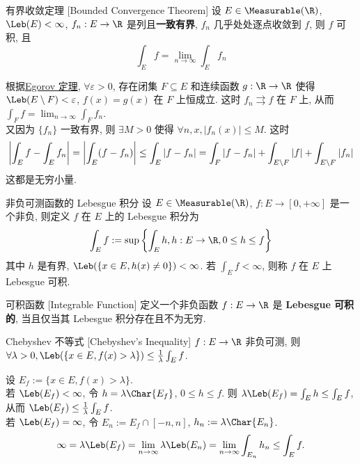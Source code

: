 \begin{thm}
    [bct]
    {有界收敛定理}
    [Bounded Convergence Theorem]
    设 $E\in\Measurable(\R)$, \(\Leb(E)<\infty\), \(f_n:E\to\R\) 是\MeasurableFunc{}列且\textbf{一致有界}, \(f_n\) 几乎处处逐点收敛到 \(f\), 则 \(f\) 可积, 且 
    \[\int_E f = \lim_{n\to\infty} \int_E f_n\]
\end{thm}
\begin{prf}
    根据\hyperref[thm:egorov]{Egorov 定理}, \(\forall\varepsilon>0\), 存在闭集 \(F\subseteq E\) 和连续函数 \(g:\R\to\R\) 使得 \(\Leb(E\setminus F)<\varepsilon\), \(f(x)=g(x)\) 在 \(F\) 上恒成立. 这时 \(f_n\rightrightarrows f\) 在 \(F\) 上, 从而 \(\int_F f = \lim_{n\to\infty} \int_F f_n\).\\
    又因为 \(\{f_n\}\) 一致有界, 则 \(\exists M>0\) 使得 \(\forall n,x, |f_n(x)|\leq M\). 这时
    \[\vqty{\int_E f-\int_Ef_n}=\vqty{\int_E(f-f_n)}\leq\int_E|f-f_n|=\int_F|f-f_n|+\int_{E\setminus F}|f|+\int_{E\setminus F}|f_n|\]
    这都是无穷小量.
\end{prf}
\begin{dfn}
    {非负可测函数的 Lebesgue 积分}
    设 $E\in\Measurable(\R)$, \(f:E\to[0,+\infty]\) 是一个非负\MeasurableFunc{}, 则定义 \(f\) 在 \(E\) 上的 Lebesgue 积分为
    \[\int_E f := \sup\qty{\int_E h, h:E\to\R, 0\leq h\leq f}\]
    其中 \(h\) 是有界\MeasurableFunc{}, \(\Leb(\{x\in E, h(x)\neq 0\})<\infty\). 若 \(\int_E f<\infty\), 则称 \(f\) 在 \(E\) 上 Lebesgue 可积.
\end{dfn}
\begin{dfn}
    {可积函数}
    [Integrable Function]
    定义一个非负函数 \(f:E\to\R\) 是 \textbf{Lebesgue 可积的}, 当且仅当其 Lebesgue 积分存在且不为无穷.
\end{dfn}
\begin{thm}
    {Chebyshev 不等式}
    [Chebyshev's Inequality]
    $f:E\to\R$ 非负可测, 则 \(\forall\lambda>0, \Leb(\{x\in E, f(x)>\lambda\})\leq\frac{1}{\lambda} \int_E f\).
\end{thm}
\begin{prf}
    设 \(E_f:=\{x\in E, f(x)>\lambda\}\).\\
    若 \(\Leb(E_f)<\infty\), 令 \(h=\lambda\Char{E_f}\), \(0\leq h\leq f\). 则 \(\lambda\Leb(E_f)=\int_E h \leq \int_E f\), 从而 \(\Leb(E_f)\leq\frac{1}{\lambda} \int_E f\).\\
    若 \(\Leb(E_f)=\infty\), 令 \(E_n:=E_f\cap [-n,n]\), \(h_n:=\lambda\Char{E_n}\). 
    \[\infty=\lambda\Leb(E_f)=\lim_{n\to\infty}\lambda\Leb(E_n)=\lim_{n\to\infty}\int_{E_n}h_n\leq\int_E f.\]
\end{prf}
